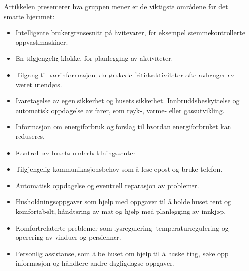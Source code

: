 {Artikkelen presenterer hva gruppen mener er de viktigste områdene for det smarte hjemmet:
\begin{itemize}
  \item Intelligente brukergrensesnitt på hvitevarer, for eksempel stemmekontrollerte oppvaskmaskiner.
  \item En tilgjengelig klokke, for planlegging av aktiviteter.
  \item Tilgang til værinformasjon, da ønskede fritidsaktiviteter ofte avhenger av været utendørs.
  \item Ivaretagelse av egen sikkerhet og husets sikkerhet. Innbruddsbeskyttelse og automatisk oppdagelse av farer, som røyk-, varme- eller gassutvikling.
  \item Informasjon om energiforbruk og forslag til hvordan energiforbruket kan reduseres.
  \item Kontroll av husets underholdningssenter.
  \item Tilgjengelig kommunikasjonsbehov som å lese epost og bruke telefon.
  \item Automatisk oppdagelse og eventuell reparasjon av problemer.
  \item Husholdningsoppgaver som hjelp med oppgaver til å holde huset rent og komfortabelt, håndtering av mat og hjelp med planlegging av innkjøp.
  \item Komfortrelaterte problemer som lysregulering, temperaturregulering og operering av vinduer og persienner.
  \item Personlig assistanse, som å be huset om hjelp til å huske ting, søke opp informasjon og håndtere andre dagligdagse oppgaver.
\end{itemize}

}

